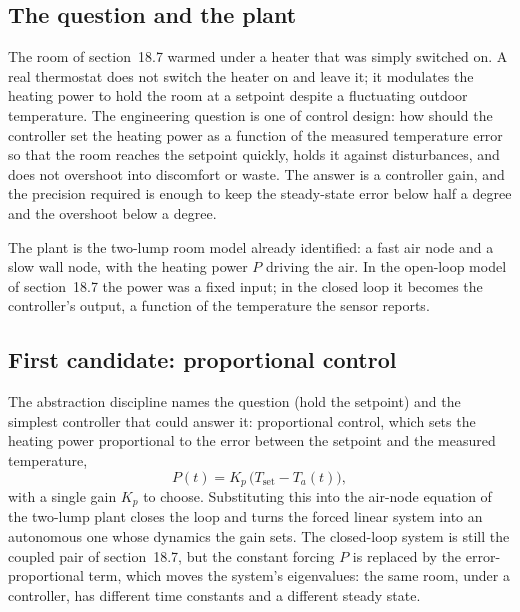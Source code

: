 \subsection{The question and the plant}

The room of section~18.7 warmed under a heater that was simply switched on.
A real thermostat does not switch the heater on and leave it; it modulates
the heating power to hold the room at a setpoint despite a fluctuating
outdoor temperature. The engineering question is one of control design: how
should the controller set the heating power as a function of the measured
temperature error so that the room reaches the setpoint quickly, holds it
against disturbances, and does not overshoot into discomfort or waste. The
answer is a controller gain, and the precision required is enough to keep
the steady-state error below half a degree and the overshoot below a degree.

The plant is the two-lump room model already identified: a fast air node
and a slow wall node, with the heating power $P$ driving the air. In the
open-loop model of section~18.7 the power was a fixed input; in the closed
loop it becomes the controller's output, a function of the temperature the
sensor reports.

\subsection{First candidate: proportional control}

The abstraction discipline names the question (hold the setpoint) and the
simplest controller that could answer it: proportional control, which sets
the heating power proportional to the error between the setpoint and the
measured temperature,
\[
P(t) = K_p\,\bigl(T_{\text{set}} - T_a(t)\bigr),
\]
with a single gain $K_p$ to choose. Substituting this into the air-node
equation of the two-lump plant closes the loop and turns the forced linear
system into an autonomous one whose dynamics the gain sets. The closed-loop
system is still the coupled pair of section~18.7, but the constant forcing
$P$ is replaced by the error-proportional term, which moves the system's
eigenvalues: the same room, under a controller, has different time
constants and a different steady state.




